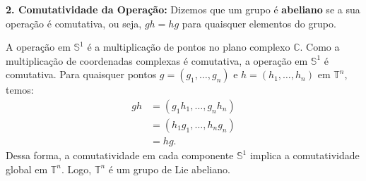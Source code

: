 {	\textbf{2. Comutatividade da Operação:}
	Dizemos que um grupo é \textbf{abeliano} se a sua operação é comutativa, ou seja, $gh = hg$ para quaisquer elementos do grupo.
	
	A operação em $\mathbb{S}^1$ é a multiplicação de pontos no plano complexo $\mathbb{C}$. Como a multiplicação de coordenadas complexas é comutativa, a operação em $\mathbb{S}^1$ é comutativa. Para quaisquer pontos $g = (g_1, \dots, g_n)$ e $h = (h_1, \dots, h_n)$ em $\mathbb{T}^n$, temos:
	\begin{align*}
		gh &= (g_1 h_1, \dots, g_n h_n) \\
		&= (h_1 g_1, \dots, h_n g_n) \\
		&= hg.
	\end{align*}
	Dessa forma, a comutatividade em cada componente $\mathbb{S}^1$ implica a comutatividade global em $\mathbb{T}^n$. Logo, $\mathbb{T}^n$ é um grupo de Lie abeliano.
}